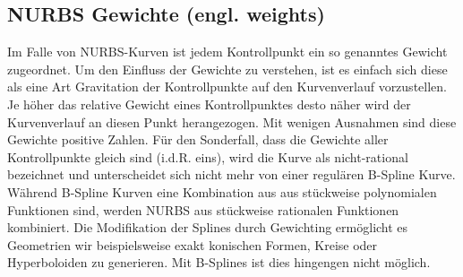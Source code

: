 \documentclass[german,a4paper,12pt,oneside]{scrbook}
\theoremstyle{definition}
\theoremstyle{definition}
\theoremstyle{definition}
\theoremstyle{definition}
\theoremstyle{definition}
\theoremstyle{definition}
\begin{document}
\subsection{NURBS Gewichte (engl. weights)}
Im Falle von NURBS-Kurven ist jedem Kontrollpunkt ein so genanntes Gewicht zugeordnet. Um den Einfluss der Gewichte zu verstehen, ist es einfach sich diese als eine Art Gravitation der Kontrollpunkte auf den Kurvenverlauf vorzustellen. Je höher das relative Gewicht eines Kontrollpunktes desto näher wird der Kurvenverlauf an diesen Punkt herangezogen. Mit wenigen Ausnahmen sind diese Gewichte positive Zahlen. Für den Sonderfall, dass die Gewichte aller Kontrollpunkte gleich sind (i.d.R. eins), wird die Kurve als nicht-rational bezeichnet und unterscheidet sich nicht mehr von einer regulären B-Spline Kurve.  Während B-Spline Kurven eine Kombination aus aus stückweise polynomialen Funktionen sind, werden NURBS aus stückweise rationalen Funktionen kombiniert. Die Modifikation der Splines durch Gewichting ermöglicht es Geometrien wir beispielsweise exakt konischen Formen, Kreise oder Hyperboloiden zu generieren. Mit B-Splines ist dies hingengen nicht möglich. 
\end{document}
